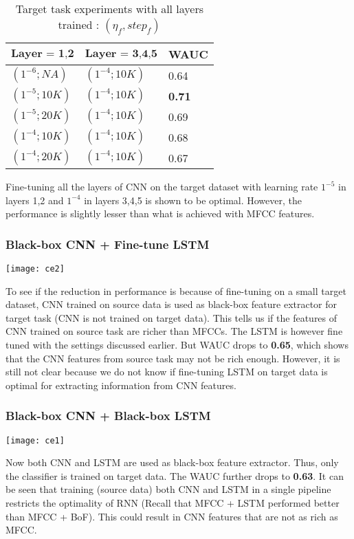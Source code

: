 \begin{table}[H]
\label{tab:a8}
\centering
\begin{tabular}{| p{} | p{}| p{}| }
\hline
$\textbf{Layer = 1,2}$ & $\textbf{Layer = 3,4,5}$ & \textbf{WAUC}\\
\hline
$(1^{-6}; NA)$ & $(1^{-4}; 10K)$ & 0.64\\
\hline
$(1^{-5}; 10K)$ & $(1^{-4}; 10K)$ & \textbf{0.71}\\
\hline
$(1^{-5}; 20K)$ & $(1^{-4}; 10K)$ & 0.69\\
\hline
$(1^{-4}; 10K)$ & $(1^{-4}; 10K)$ & 0.68\\
\hline
$(1^{-4}; 20K)$ & $(1^{-4}; 10K)$ & 0.67\\
\hline
\end{tabular}
\caption{Target task experiments with all layers trained : $(\eta_{f}, {step}_{f})$}
\end{table}
\noindent Fine-tuning all the layers of CNN on the target dataset with learning rate $1^{-5}$ in layers 1,2 and $1^{-4}$ in layers 3,4,5 is shown to be optimal. However, the performance is slightly lesser than what is achieved with MFCC features.

\subsubsection{Black-box CNN + Fine-tune LSTM}  
\begin{minipage}{0.15\textwidth}
\texttt{[image: ce2]}
\end{minipage}
\begin{minipage}{0.80\textwidth}
To see if the reduction in performance is because of fine-tuning on a small target dataset, CNN trained on source data is used as black-box feature extractor for target task (CNN is not trained on target data). This tells us if the features of CNN trained on source task are richer than MFCCs. The LSTM is however fine tuned with the settings discussed earlier. But WAUC drops to \textbf{0.65}, which shows that the CNN features from source task may not be rich enough. However, it is still not clear because we do not know if fine-tuning LSTM on target data is optimal for extracting information from CNN features. 
\end{minipage}

\subsubsection{Black-box CNN + Black-box LSTM}
\begin{minipage}{0.15\textwidth}
\texttt{[image: ce1]}
\end{minipage}
\begin{minipage}{0.80\textwidth}
Now both CNN and LSTM are used as black-box feature extractor. Thus, only the classifier is trained on target data. The WAUC further drops to \textbf{0.63}. It can be seen that training (source data) both CNN and LSTM in a single pipeline restricts the optimality of RNN (Recall that MFCC + LSTM performed better than MFCC + BoF). This could result in CNN features that are not as rich as MFCC. 
\end{minipage}

